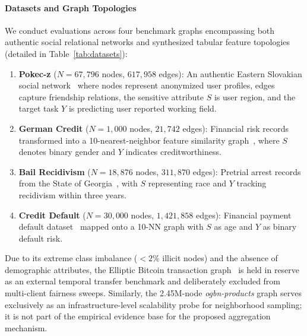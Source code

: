 \paragraph{Datasets and Graph Topologies}
We conduct evaluations across four benchmark graphs encompassing both authentic social relational networks and synthesized tabular feature topologies (detailed in Table~\ref{tab:datasets}):
\begin{enumerate}[leftmargin=*]
    \item \textbf{Pokec-z} ($N = 67{,}796$ nodes, $617{,}958$ edges): An authentic Eastern Slovakian social network~\citep{takac2012data} where nodes represent anonymized user profiles, edges capture friendship relations, the sensitive attribute $S$ is user region, and the target task $Y$ is predicting user reported working field.
    \item \textbf{German Credit} ($N = 1{,}000$ nodes, $21{,}742$ edges): Financial risk records transformed into a 10-nearest-neighbor feature similarity graph~\citep{agarwal2021towards}, where $S$ denotes binary gender and $Y$ indicates creditworthiness.
    \item \textbf{Bail Recidivism} ($N = 18{,}876$ nodes, $311{,}870$ edges): Pretrial arrest records from the State of Georgia~\citep{jordan2015effect}, with $S$ representing race and $Y$ tracking recidivism within three years.
    \item \textbf{Credit Default} ($N = 30{,}000$ nodes, $1{,}421{,}858$ edges): Financial payment default dataset~\citep{yeh2009comparisons} mapped onto a 10-NN graph with $S$ as age and $Y$ as binary default risk.
\end{enumerate}
Due to its extreme class imbalance ($<2\%$ illicit nodes) and the absence of demographic attributes, the Elliptic Bitcoin transaction graph~\citep{weber2019anti} is held in reserve as an external temporal transfer benchmark and deliberately excluded from multi-client fairness sweeps. Similarly, the 2.45M-node \textit{ogbn-products} graph serves exclusively as an infrastructure-level scalability probe for neighborhood sampling; it is not part of the empirical evidence base for the proposed aggregation mechanism.



